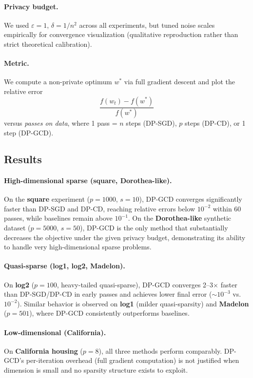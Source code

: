 \documentclass[11pt,a4paper]{article}
\begin{document}
\paragraph{Privacy budget.} We used $\varepsilon = 1$, $\delta = 1/n^2$ across all experiments, but tuned noise scales empirically for convergence visualization (qualitative reproduction rather than strict theoretical calibration).

\paragraph{Metric.} We compute a non-private optimum $w^*$ via full gradient descent and plot the relative error
\[
\frac{f(w_t) - f(w^*)}{f(w^*)}
\]
versus \emph{passes on data}, where 1 pass = $n$ steps (DP-SGD), $p$ steps (DP-CD), or 1 step (DP-GCD).

\subsection{Results}

\paragraph{High-dimensional sparse (square, Dorothea-like).}
On the \textbf{square} experiment ($p = 1000$, $s = 10$), DP-GCD converges significantly faster than DP-SGD and DP-CD, reaching relative errors below $10^{-2}$ within 60 passes, while baselines remain above $10^{-1}$. On the \textbf{Dorothea-like} synthetic dataset ($p = 5000$, $s = 50$), DP-GCD is the only method that substantially decreases the objective under the given privacy budget, demonstrating its ability to handle very high-dimensional sparse problems.

\paragraph{Quasi-sparse (log1, log2, Madelon).}
On \textbf{log2} ($p = 100$, heavy-tailed quasi-sparse), DP-GCD converges 2--3$\times$ faster than DP-SGD/DP-CD in early passes and achieves lower final error ($\sim 10^{-3}$ vs.\ $10^{-2}$). Similar behavior is observed on \textbf{log1} (milder quasi-sparsity) and \textbf{Madelon} ($p = 501$), where DP-GCD consistently outperforms baselines.

\paragraph{Low-dimensional (California).}
On \textbf{California housing} ($p = 8$), all three methods perform comparably. DP-GCD's per-iteration overhead (full gradient computation) is not justified when dimension is small and no sparsity structure exists to exploit.
\end{document}
